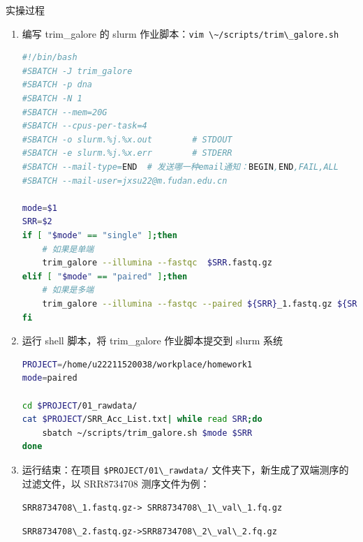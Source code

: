 \documentclass[
  a4paper,
]{article}
\newcommand{\passthrough}[1]{#1}
\begin{document}
实操过程

\begin{enumerate}
\def\labelenumi{\arabic{enumi}.}
\item
  编写 trim\_galore 的 slurm
  作业脚本：\passthrough{\lstinline!vim \~/scripts/trim\_galore.sh!}\hspace{0pt}

\begin{lstlisting}[language=bash]
#!/bin/bash
#SBATCH -J trim_galore
#SBATCH -p dna
#SBATCH -N 1
#SBATCH --mem=20G
#SBATCH --cpus-per-task=4
#SBATCH -o slurm.%j.%x.out        # STDOUT
#SBATCH -e slurm.%j.%x.err        # STDERR
#SBATCH --mail-type=END  # 发送哪一种email通知：BEGIN,END,FAIL,ALL
#SBATCH --mail-user=jxsu22@m.fudan.edu.cn

mode=$1
SRR=$2
if [ "$mode" == "single" ];then
    # 如果是单端
    trim_galore --illumina --fastqc  $SRR.fastq.gz
elif [ "$mode" == "paired" ];then
    # 如果是多端
    trim_galore --illumina --fastqc --paired ${SRR}_1.fastq.gz ${SRR}_2.fastq.gz
fi
\end{lstlisting}
\item
  运行 shell 脚本，将 trim\_galore 作业脚本提交到 slurm 系统

\begin{lstlisting}[language=bash]
PROJECT=/home/u22211520038/workplace/homework1
mode=paired

cd $PROJECT/01_rawdata/
cat $PROJECT/SRR_Acc_List.txt| while read SRR;do 
    sbatch ~/scripts/trim_galore.sh $mode $SRR
done
\end{lstlisting}
\item
  运行结束：在项目 \passthrough{\lstinline!$PROJECT/01\_rawdata/!}
  \hspace{0pt}文件夹下，新生成了双端测序的过滤文件，以 SRR8734708
  测序文件为例：

  \hspace{0pt}\passthrough{\lstinline!SRR8734708\_1.fastq.gz-> SRR8734708\_1\_val\_1.fq.gz!}\hspace{0pt}

  \hspace{0pt}\passthrough{\lstinline!SRR8734708\_2.fastq.gz->SRR8734708\_2\_val\_2.fq.gz!}\hspace{0pt}


\end{enumerate}
\end{document}
